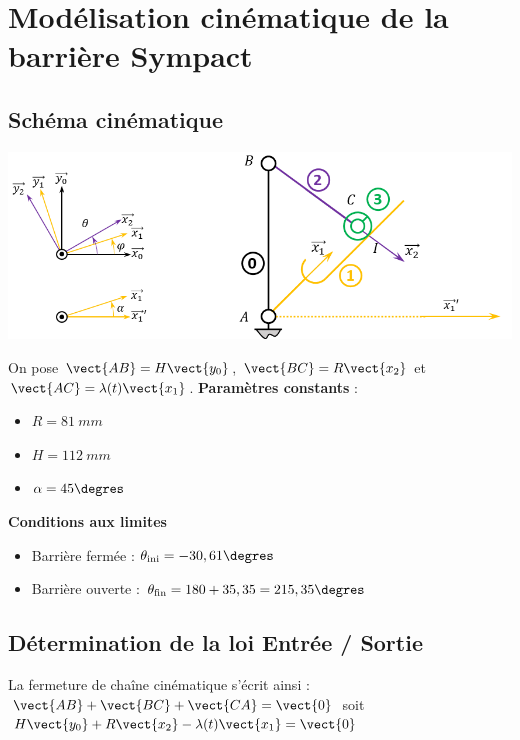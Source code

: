 

\section{Modélisation cinématique de la barrière Sympact}
\subsection{Schéma cinématique}


\begin{center}
 \includegraphics[width=.95\textwidth]{images/fig_01}
\end{center}

On pose $\vect{AB}=H\vect{y_0}$, $\vect{BC}=R\vect{x_2}$ et
$\vect{AC}=\lambda(t)\vect{x_1}$. 
\textbf{Paramètres constants} :
\begin{itemize}
\item $R = \SI{81}{mm} $
\item $H = \SI{112}{mm}$
\item $\alpha = 45\degres $
\end{itemize}

\textbf{Conditions aux limites}
\begin{itemize}
\item Barrière fermée : $\theta_{\text{ini}} =-30,61\degres$ 
\item Barrière ouverte : $\theta_{\text{fin}} =180+35,35 = 215,35\degres$ 
\end{itemize}

\subsection{Détermination de la loi Entrée / Sortie}

La fermeture de chaîne cinématique s'écrit ainsi : $\vect{AB}+\vect{BC}+\vect{CA}=\vect{0}$ soit $H\vect{y_0}+R\vect{x_2}-\lambda(t)\vect{x_1}=\vect{0}$


